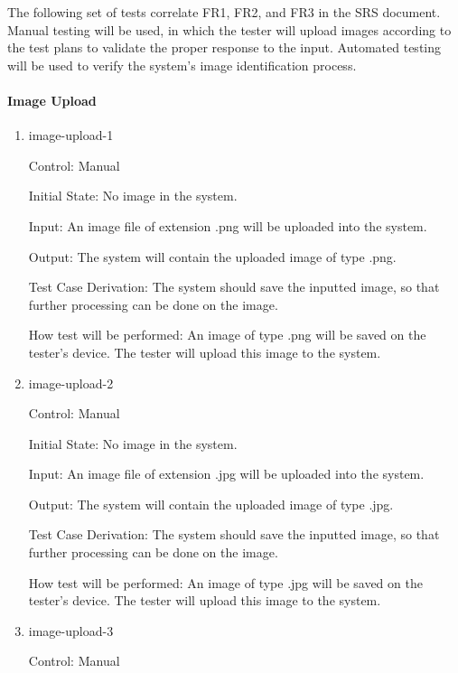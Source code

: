\documentclass[12pt, titlepage]{article}
\begin{document}
	The following set of tests correlate FR1, FR2, and FR3 in the SRS document. Manual testing will be used, in which the tester will upload images according to the test plans to validate the proper response to the input. Automated testing will be used to verify the system's image identification process.
	
	\paragraph{Image Upload}
	
	\begin{enumerate}
		
		\item{image-upload-1\\}
		
		Control: Manual
		
		Initial State: No image in the system.
		
		Input: An image file of extension .png will be uploaded into the system.
		
		Output: The system will contain the uploaded image of type .png.
		
		Test Case Derivation: The system should save the inputted image, so that further processing can be done on the image.
		
		How test will be performed: An image of type .png will be saved on the tester's device. The tester will upload this image to the system.
		
		\item{image-upload-2\\}
		
		Control: Manual
		
		Initial State: No image in the system.
		
		Input: An image file of extension .jpg will be uploaded into the system.
		
		Output: The system will contain the uploaded image of type .jpg.
		
		Test Case Derivation: The system should save the inputted image, so that further processing can be done on the image.
		
		How test will be performed: An image of type .jpg will be saved on the tester's device. The tester will upload this image to the system.
		
		\item{image-upload-3\\}
		
		Control: Manual
		

\end{enumerate}
\end{document}
